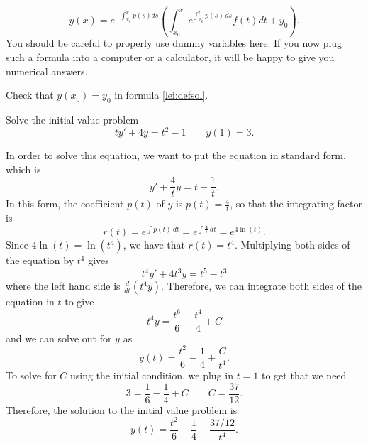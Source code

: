 \documentclass{ximera}
\begin{document}
\begin{equation} \label{lei:defsol}
y(x) = e^{-\int_{x_0}^x p(s) ds} \left( \int_{x_0}^x e^{\int_{x_0}^t p(s)\, ds} f(t)  dt + y_0 \right).%
\end{equation}
You should be careful to properly use dummy variables here.  If you now plug such a formula into a computer or a calculator, it will be happy to give you numerical answers.

\begin{exercise}
    Check that $y(x_0) = y_0$ in formula \eqref{lei:defsol}.
\end{exercise}

\begin{example}
    Solve the initial value problem
    \begin{equation*}
        ty' + 4y = t^2 - 1 \qquad y(1) = 3.
    \end{equation*}
\end{example}
\begin{exampleSol}
    In order to solve this equation, we want to put the equation in standard form, which is
    \begin{equation*}
        y' + \frac{4}{t}y = t - \frac{1}{t}.
    \end{equation*}
    In this form, the coefficient $p(t)$ of $y$ is $p(t) = \frac{4}{t}$, so that the integrating factor is 
    \[ 
        r(t) = e^{\int p(t)\ dt} = e^{\int \frac{4}{t}\ dt} = e^{4\ln(t)}. 
    \] 
    Since $4\ln(t) = \ln(t^4)$, we have that $r(t) = t^4$. Multiplying both sides of the equation by $t^4$ gives
    \begin{equation*}
        t^4y' + 4t^3 y = t^5 - t^3
    \end{equation*}
    where the left hand side is $\frac{d}{dt}(t^4y)$. Therefore, we can integrate both sides of the equation in $t$ to give
    \begin{equation*}
        t^4 y = \frac{t^6}{6} - \frac{t^4}{4} + C
    \end{equation*}
    and we can solve out for $y$ as
    \begin{equation*}
        y(t) = \frac{t^2}{6} - \frac{1}{4} + \frac{C}{t^4}.
    \end{equation*}
    To solve for $C$ using the initial condition, we plug in $t=1$ to get that we need
    \begin{equation*}
        3 = \frac{1}{6} - \frac{1}{4} + C \qquad C = \frac{37}{12}.
    \end{equation*}
    Therefore, the solution to the initial value problem is
    \begin{equation*}
        y(t) = \frac{t^2}{6} - \frac{1}{4} + \frac{37/12}{t^4}.
    \end{equation*}
\end{exampleSol}
\end{document}
